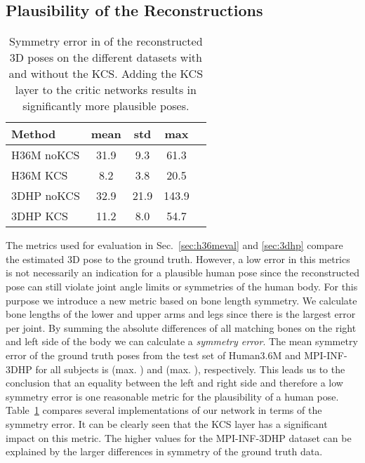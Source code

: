 \documentclass[10pt,twocolumn,letterpaper]{article}
\begin{document}
\subsection{Plausibility of the Reconstructions}
\begin{table}[htp]
	\footnotesize
	\caption{Symmetry error in  of the reconstructed 3D poses on the different datasets with and without the KCS. Adding the KCS layer to the critic networks results in significantly more plausible poses.}
	\centering
	\begin{tabular}{l|cccc}
 		Method & mean & std & max \\
		\hline
		\rowcolor{grayLight}
		H36M noKCS  & 31.9 & 9.3  & 61.3 \\
		\rowcolor{grayDark}
		H36M KCS    & 8.2  & 3.8  & 20.5 \\
		\rowcolor{grayLight}
		3DHP noKCS  & 32.9  & 21.9  & 143.9   \\
		\rowcolor{grayDark}
		3DHP KCS    & 11.2  & 8.0  & 54.7 \\
	\end{tabular}
	\label{tab:symmerr}
\end{table}
The metrics used for evaluation in Sec.~\ref{sec:h36meval} and \ref{sec:3dhp} compare the estimated 3D pose to the ground truth.
However, a low error in this metrics is not necessarily an indication for a plausible human pose since the reconstructed pose can still violate joint angle limits or symmetries of the human body.
For this purpose we introduce a new metric based on bone length symmetry.
We calculate bone lengths of the lower and upper arms and legs since there is the largest error per joint.
By summing the absolute differences of all matching bones on the right and left side of the body we can calculate a \textit{symmetry error}.
The mean symmetry error of the ground truth poses from the test set of Human3.6M and MPI-INF-3DHP for all subjects is  (max. ) and  (max. ), respectively.
This leads us to the conclusion that an equality between the left and right side and therefore a low symmetry error is one reasonable metric for the plausibility of a human pose.
Table~\ref{tab:symmerr} compares several implementations of our network in terms of the symmetry error.
It can be clearly seen that the KCS layer has a significant impact on this metric.
The higher values for the MPI-INF-3DHP dataset can be explained by the larger differences in symmetry of the ground truth data.
\end{document}
